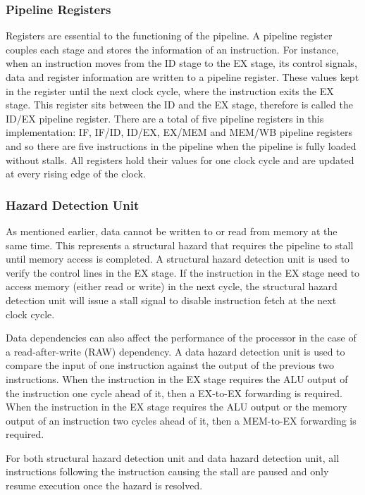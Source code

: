 \documentclass[conference]{IEEEtran}
\begin{document}
\subsubsection{Pipeline Registers}
Registers are essential to the functioning of the pipeline. A pipeline register couples each stage and stores the information of an instruction. For instance, when an instruction moves from the ID stage to the EX stage, its control signals, data and register information are written to a pipeline register. These values kept in the register until the next clock cycle, where the instruction exits the EX stage. This register sits between the ID and the EX stage, therefore is called the ID/EX pipeline register. There are a total of five pipeline registers in this implementation: IF, IF/ID, ID/EX, EX/MEM and MEM/WB pipeline registers and so there are five instructions in the pipeline when the pipeline is fully loaded without stalls. All registers hold their values for one clock cycle and are updated at every rising edge of the clock. 

\subsubsection{Hazard Detection Unit}
As mentioned earlier, data cannot be written to or read from memory at the same time. This represents a structural hazard that requires the pipeline to stall until memory access is completed. A structural hazard detection unit is used to verify the control lines in the EX stage. If the instruction in the EX stage need to access memory (either read or write) in the next cycle, the structural hazard detection unit will issue a stall signal to disable instruction fetch at the next clock cycle. 

Data dependencies can also affect the performance of the processor in the case of a read-after-write (RAW) dependency. A data hazard detection unit is used to compare the input of one instruction against the output of the previous two instructions. When the instruction in the EX stage requires the ALU output of the instruction one cycle ahead of it, then a EX-to-EX forwarding is required. When the instruction in the EX stage requires the ALU output or the memory output of an instruction two cycles ahead of it, then a MEM-to-EX forwarding is required.

For both structural hazard detection unit and data hazard detection unit, all instructions following the instruction causing the stall are paused and only resume execution once the hazard is resolved.
\end{document}
